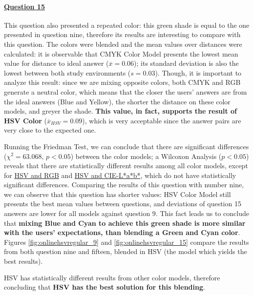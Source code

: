 \paragraph{\ul{Question 15}}
%
This question also presented a repeated color: this green shade is equal to the one presented in question nine, therefore its results are interesting to compare with this question.
The colors were blended and the mean values over distances were calculated: it is observable that CMYK Color Model presents the lowest mean value
for distance to ideal answer ($\overline{x} = 0.06$); its standard deviation is also the lowest between both study environments ($s = 0.03$). Though, it is important to analyze this result: since we
are mixing opposite colors, both CMYK and RGB generate a neutral color, which means that the closer the users' answers are from the ideal answers (Blue and Yellow), the shorter the distance on these color
models, and greyer the shade. \textbf{This value, in fact, supports the result of HSV Color} ($\overline{x}_{HSV} = 0.09$), which is very acceptable since the answer pairs are very close to the expected one. \par
%
Running the Friedman Test, we can conclude that there are significant differences ($\chi^2 = 63.068$, $p < 0.05$) between the color models; a Wilcoxon Analysis ($p < 0.05$) reveals that
there are statistically different results among all color models, except for \ul{HSV and RGB} and \ul{HSV and CIE-L*a*b*}, which do not have statistically significant differences.
Comparing the results of this question with number nine, we can observe that this question has shorter values: HSV Color Model still presents the best mean values between questions, and deviations of question 15
answers are lower for all models against question 9. This fact leads us to conclude that \textbf{mixing Blue and Cyan to achieve this green shade is more similar with the users' expectations, than blending a Green and
Cyan color}. Figures \ref{fig:onlinehsvregular_9} and \ref{fig:onlinehsvregular_15} compare the results from both question nine and fifteen, blended in HSV (the model which yields the best results). \par
%
HSV has statistically different results from other color models, therefore concluding that \textbf{HSV has the best solution for this blending}.
%
